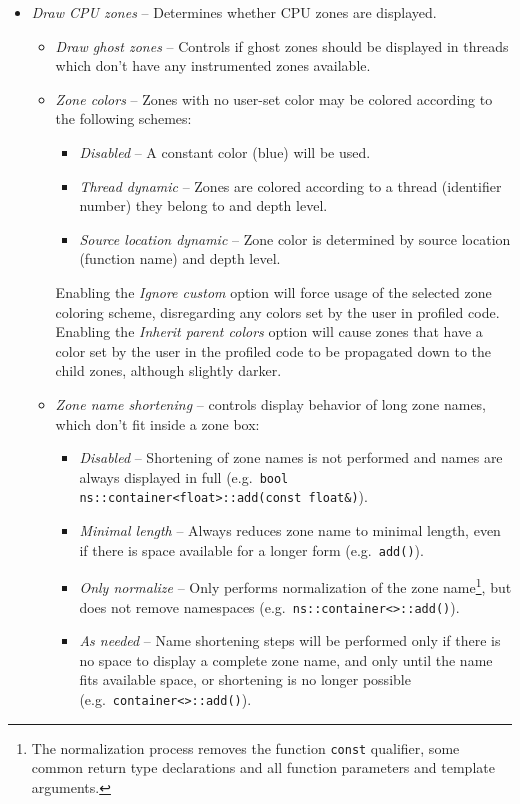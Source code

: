 \documentclass[hidelinks,titlepage,a4paper,twoside]{article}
\begin{document}
\begin{itemize}
\item \emph{\faMicrochip{} Draw CPU zones} -- Determines whether CPU zones are displayed.
\begin{itemize}
\item \emph{\faGhost{} Draw ghost zones} -- Controls if ghost zones should be displayed in threads which don't have any instrumented zones available.
\item \emph{\faPalette{} Zone colors} -- Zones with no user-set color may be colored according to the following schemes:
\begin{itemize}
\item \emph{Disabled} -- A constant color (blue) will be used.
\item \emph{Thread dynamic} -- Zones are colored according to a thread (identifier number) they belong to and depth level.
\item \emph{Source location dynamic} -- Zone color is determined by source location (function name) and depth level.
\end{itemize}
Enabling the \emph{Ignore custom} option will force usage of the selected zone coloring scheme, disregarding any colors set by the user in profiled code.
Enabling the \emph{Inherit parent colors} option will cause zones that have a color set by the user in the profiled code to be propagated down to the child zones, although slightly darker.
\item \emph{\faRulerHorizontal{} Zone name shortening} -- controls display behavior of long zone names, which don't fit inside a zone box:
\begin{itemize}
\item \emph{Disabled} -- Shortening of zone names is not performed and names are always displayed in full (e.g.\ \texttt{bool ns::container<float>::add(const float\&)}).
\item \emph{Minimal length} -- Always reduces zone name to minimal length, even if there is space available for a longer form (e.g.\ \texttt{add()}).
\item \emph{Only normalize} -- Only performs normalization of the zone name\footnote{The normalization process removes the function \texttt{const} qualifier, some common return type declarations and all function parameters and template arguments.}, but does not remove namespaces (e.g.\ \texttt{ns::container<>::add()}).
\item \emph{As needed} -- Name shortening steps will be performed only if there is no space to display a complete zone name, and only until the name fits available space, or shortening is no longer possible (e.g.\ \texttt{container<>::add()}).

\end{itemize}
\end{itemize}
\end{itemize}
\end{document}
